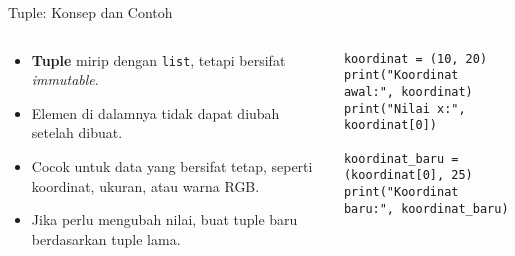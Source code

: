 \documentclass[aspectratio=169, table]{beamer}
\begin{document}
\begin{frame}[fragile]{Tuple: Konsep dan Contoh}
\vspace{20pt}

\begin{columns}[T]
  \begin{column}{0.48\textwidth}
    \begin{itemize}
      \item \textbf{Tuple} mirip dengan \texttt{list}, tetapi bersifat \textit{immutable}.
      \item Elemen di dalamnya tidak dapat diubah setelah dibuat.
      \item Cocok untuk data yang bersifat tetap, seperti koordinat, ukuran, atau warna RGB.
      \item Jika perlu mengubah nilai, buat tuple baru berdasarkan tuple lama.
    \end{itemize}
  \end{column}

  \begin{column}{0.48\textwidth}
    \begin{lstlisting}[style=PythonStyle]
koordinat = (10, 20)
print("Koordinat awal:", koordinat)
print("Nilai x:", koordinat[0])

koordinat_baru = (koordinat[0], 25)
print("Koordinat baru:", koordinat_baru)
    \end{lstlisting}
  \end{column}
\end{columns}

\end{frame}
\end{document}
